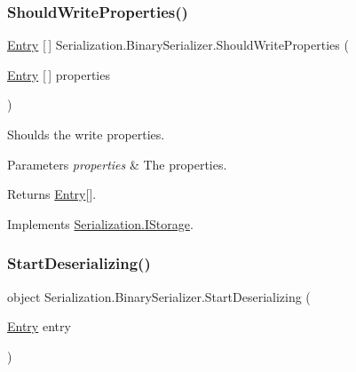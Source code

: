 \subsubsection{\texorpdfstring{Should\+Write\+Properties()}{ShouldWriteProperties()}}
{\footnotesize\ttfamily \hyperlink{class_serialization_1_1_entry}{Entry} \mbox{[}$\,$\mbox{]} Serialization.\+Binary\+Serializer.\+Should\+Write\+Properties (\begin{DoxyParamCaption}\item[{\hyperlink{class_serialization_1_1_entry}{Entry} \mbox{[}$\,$\mbox{]}}]{properties }\end{DoxyParamCaption})\hspace{0.3cm}{\ttfamily [inline]}}



Shoulds the write properties. 


\begin{DoxyParams}{Parameters}
{\em properties} & The properties.\\
\hline
\end{DoxyParams}
\begin{DoxyReturn}{Returns}
\hyperlink{class_serialization_1_1_entry}{Entry}\mbox{[}\mbox{]}.
\end{DoxyReturn}


Implements \hyperlink{interface_serialization_1_1_i_storage_a0d4c95743d604600b55492194d54717b}{Serialization.\+I\+Storage}.

\mbox{\label{class_serialization_1_1_binary_serializer_a9b376977bd19d9bfef1fce28e110220a}} 
\subsubsection{\texorpdfstring{Start\+Deserializing()}{StartDeserializing()}\hspace{0.1cm}{\footnotesize\ttfamily [1/2]}}
{\footnotesize\ttfamily object Serialization.\+Binary\+Serializer.\+Start\+Deserializing (\begin{DoxyParamCaption}\item[{\hyperlink{class_serialization_1_1_entry}{Entry}}]{entry }\end{DoxyParamCaption})\hspace{0.3cm}{\ttfamily [inline]}}



